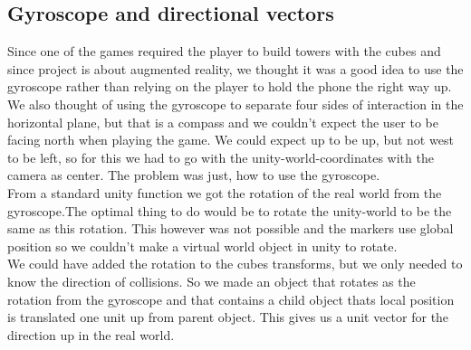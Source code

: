 \subsection{Gyroscope and directional vectors}
Since one of the games required the player to build towers with the cubes and since project is about augmented reality, we thought it was a good idea to use the gyroscope rather than relying on the player to hold the phone the right way up. We also thought of using the gyroscope to separate four sides of interaction in the horizontal plane, but that is a compass and we couldn't expect the user to be facing north when playing the game. We could expect up to be up, but not west to be left, so for this we had to go with the unity-world-coordinates with the camera as center. The problem was just, how to use the gyroscope.\\
From a standard unity function we got the rotation of the real world from the gyroscope.The optimal thing to do would be to rotate the unity-world to be the same as this rotation. This however was not possible and the markers use global position so we couldn't make a virtual world object in unity to rotate.\\
We could have added the rotation to the cubes transforms, but we only needed to know the direction of collisions. So we made an object that rotates as the rotation from the gyroscope and that contains a child object thats local position is translated one unit up from parent object. This gives us a unit vector for the direction up in the real world.
\\
